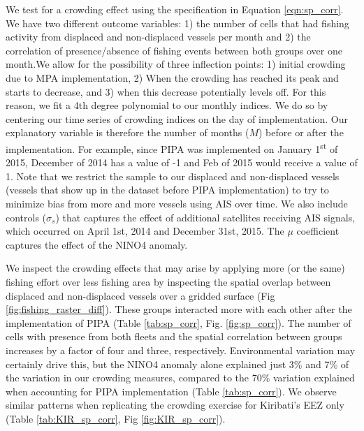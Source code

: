 \documentclass[12pt]{article}
\begin{document}
We test for a crowding effect using the specification in Equation \ref{eqn:sp_corr}. We have two different outcome variables:
1) the number of cells that had fishing activity from displaced and non-displaced vessels per month and 2) the correlation of presence/absence of fishing events between both groups over one month.We allow for the possibility of three inflection points: 1) initial crowding due to MPA implementation, 2) When the crowding has reached its peak and starts to decrease, and 3) when this decrease potentially levels off. For this reason, we fit a 4th degree polynomial to our monthly indices. We do so by centering our time series of crowding indices on the day of implementation. Our explanatory variable is therefore the number of months ($M$) before or after the implementation. For example, since PIPA was implemented on January 1\textsuperscript{st} of 2015, December of 2014 has a value of -1 and Feb of 2015 would receive a value of 1. Note that we restrict the sample to our displaced and non-displaced vessels (vessels that show up in the dataset before PIPA implementation) to try to minimize bias from more and more vessels using AIS over time. We also include controls ($\sigma_s$) that captures the effect of additional satellites receiving AIS signals, which occurred on April 1st, 2014 and December 31st, 2015. The $\mu$ coefficient captures the effect of the NINO4 anomaly.

We inspect the crowding effects that may arise by applying more (or the same) fishing effort over less fishing area by inspecting the spatial overlap between displaced and non-displaced vessels over a gridded surface (Fig \ref{fig:fishing_raster_diff}). These groups interacted more with each other after the implementation of PIPA (Table \ref{tab:sp_corr}, Fig. \ref{fig:sp_corr}). The number of cells with presence from both fleets and the spatial correlation between groups increases by a factor of four and three, respectively. Environmental variation may certainly drive this, but the NINO4 anomaly alone explained just 3\% and 7\% of the variation in our crowding measures, compared to the 70\% variation explained when accounting for PIPA implementation (Table \ref{tab:sp_corr}). We observe similar patterns when replicating the crowding exercise for Kiribati's EEZ only (Table \ref{tab:KIR_sp_corr}, Fig \ref{fig:KIR_sp_corr}).
\end{document}
